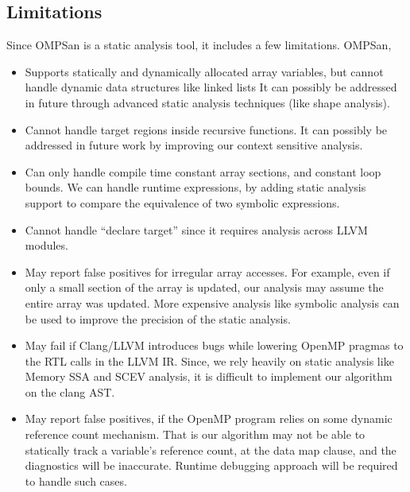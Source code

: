 \subsection{Limitations}
\label{limitation}
Since OMPSan is a static analysis tool, 
it includes a few limitations. OMPSan, 
\vspace{-2pt}
\begin{itemize}
 \item Supports statically and dynamically allocated array variables, 
 but cannot 
 handle dynamic data structures like linked lists
 It can possibly be 
 addressed in future through advanced static analysis techniques (like shape analysis).
 \item Cannot handle target regions inside recursive functions. 
 It can possibly be addressed in future work by improving our context 
 sensitive analysis.
 \item Can only handle compile time 
 constant array sections, and constant loop bounds.
 We can handle runtime expressions, by adding static analysis support to 
 compare the equivalence of two symbolic expressions.
 \item Cannot handle “declare target” 
 since it requires analysis across LLVM modules.
 \item May report false positives for irregular array accesses.
  For example, even if only a small section of the array is updated, 
  our analysis may assume the entire array was updated. More 
  expensive analysis like symbolic analysis can be used to 
  improve the precision of the static analysis.
  \item May fail if Clang/LLVM introduces bugs while 
  lowering OpenMP pragmas to the RTL calls in the LLVM IR.
  Since, 
  we rely heavily on static analysis like Memory SSA and SCEV analysis, 
  it is difficult to implement our algorithm on the clang AST.
  \item May report false positives, if the OpenMP program relies 
  on some dynamic reference count mechanism. 
  That is our algorithm may not be able to 
  statically track a variable's reference count, at the data map clause, 
  and the diagnostics will be inaccurate. Runtime debugging approach 
  will be required to handle such cases.
  
\end{itemize}
